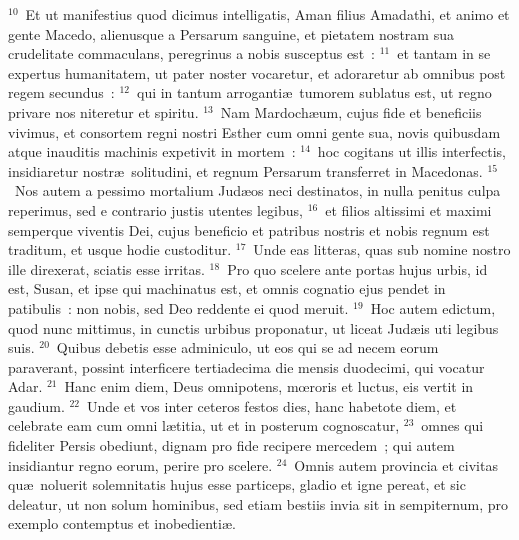 ${}^{10}$~Et ut manifestius quod dicimus intelligatis, Aman filius Amadathi, et animo et gente Macedo, alienusque a Persarum sanguine, et pietatem nostram sua crudelitate commaculans, peregrinus a nobis susceptus est~:
${}^{11}$~et tantam in se expertus humanitatem, ut pater noster vocaretur, et adoraretur ab omnibus post regem secundus~:
${}^{12}$~qui in tantum arroganti\ae\ tumorem sublatus est, ut regno privare nos niteretur et spiritu.
${}^{13}$~Nam Mardoch\ae um, cujus fide et beneficiis vivimus, et consortem regni nostri Esther cum omni gente sua, novis quibusdam atque inauditis machinis expetivit in mortem~:
${}^{14}$~hoc cogitans ut illis interfectis, insidiaretur nostr\ae\ solitudini, et regnum Persarum transferret in Macedonas.
${}^{15}$~Nos autem a pessimo mortalium Jud\ae os neci destinatos, in nulla penitus culpa reperimus, sed e contrario justis utentes legibus,
${}^{16}$~et filios altissimi et maximi semperque viventis Dei, cujus beneficio et patribus nostris et nobis regnum est traditum, et usque hodie custoditur.
${}^{17}$~Unde eas litteras, quas sub nomine nostro ille direxerat, sciatis esse irritas.
${}^{18}$~Pro quo scelere ante portas hujus urbis, id est, Susan, et ipse qui machinatus est, et omnis cognatio ejus pendet in patibulis~: non nobis, sed Deo reddente ei quod meruit.
${}^{19}$~Hoc autem edictum, quod nunc mittimus, in cunctis urbibus proponatur, ut liceat Jud\ae is uti legibus suis.
${}^{20}$~Quibus debetis esse adminiculo, ut eos qui se ad necem eorum paraverant, possint interficere tertiadecima die mensis duodecimi, qui vocatur Adar.
${}^{21}$~Hanc enim diem, Deus omnipotens, mœroris et luctus, eis vertit in gaudium.
${}^{22}$~Unde et vos inter ceteros festos dies, hanc habetote diem, et celebrate eam cum omni l\ae titia, ut et in posterum cognoscatur,
${}^{23}$~omnes qui fideliter Persis obediunt, dignam pro fide recipere mercedem~; qui autem insidiantur regno eorum, perire pro scelere.
${}^{24}$~Omnis autem provincia et civitas qu\ae\ noluerit solemnitatis hujus esse particeps, gladio et igne pereat, et sic deleatur, ut non solum hominibus, sed etiam bestiis invia sit in sempiternum, pro exemplo contemptus et inobedienti\ae .
